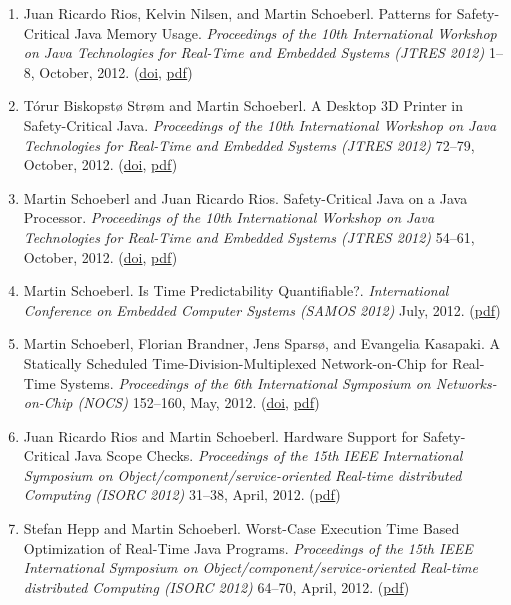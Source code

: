 \begin{enumerate}
\item Juan Ricardo Rios, Kelvin Nilsen, and Martin Schoeberl.
 Patterns for Safety-Critical Java Memory Usage.
 \emph{Proceedings of the 10th International Workshop on Java Technologies for Real-Time and Embedded Systems (JTRES 2012)} 1--8, October, 2012.
(\href{http://dx.doi.org/10.1145/2388936.2388938}{doi}, \href{http://www.jopdesign.com/doc/scopeuse.pdf}{pdf})

\item T{\'o}rur Biskopst{\o} Str{\o}m and Martin Schoeberl.
 A Desktop 3D Printer in Safety-Critical Java.
 \emph{Proceedings of the 10th International Workshop on Java Technologies for Real-Time and Embedded Systems (JTRES 2012)} 72--79, October, 2012.
(\href{http://dx.doi.org/10.1145/2388936.2388949}{doi}, \href{http://www.jopdesign.com/doc/scjreprap.pdf}{pdf})

\item Martin Schoeberl and Juan Ricardo Rios.
 Safety-Critical Java on a Java Processor.
 \emph{Proceedings of the 10th International Workshop on Java Technologies for Real-Time and Embedded Systems (JTRES 2012)} 54--61, October, 2012.
(\href{http://dx.doi.org/10.1145/2388936.2388946}{doi}, \href{http://www.jopdesign.com/doc/jopscj.pdf}{pdf})

\item Martin Schoeberl.
 Is Time Predictability Quantifiable?.
 \emph{International Conference on Embedded Computer Systems (SAMOS 2012)} July, 2012.
(\href{http://www.jopdesign.com/doc/tpquant.pdf}{pdf})

\item Martin Schoeberl, Florian Brandner, Jens Spars{\o}, and Evangelia Kasapaki.
 A Statically Scheduled Time-Division-Multiplexed Network-on-Chip for Real-Time Systems.
 \emph{Proceedings of the 6th International Symposium on Networks-on-Chip (NOCS)} 152--160, May, 2012.
(\href{http://dx.doi.org/10.1109/NOCS.2012.25}{doi}, \href{http://www.jopdesign.com/doc/s4noc.pdf}{pdf})

\item Juan Ricardo Rios and Martin Schoeberl.
 Hardware Support for Safety-Critical Java Scope Checks.
 \emph{Proceedings of the 15th IEEE International Symposium on Object/component/service-oriented Real-time distributed Computing (ISORC 2012)} 31--38, April, 2012.
(\href{http://www.jopdesign.com/doc/hwscope.pdf}{pdf})

\item Stefan Hepp and Martin Schoeberl.
 Worst-Case Execution Time Based Optimization of Real-Time Java Programs.
 \emph{Proceedings of the 15th IEEE International Symposium on Object/component/service-oriented Real-time distributed Computing (ISORC 2012)} 64--70, April, 2012.
(\href{http://www.jopdesign.com/doc/wcetopt.pdf}{pdf})



\end{enumerate}

